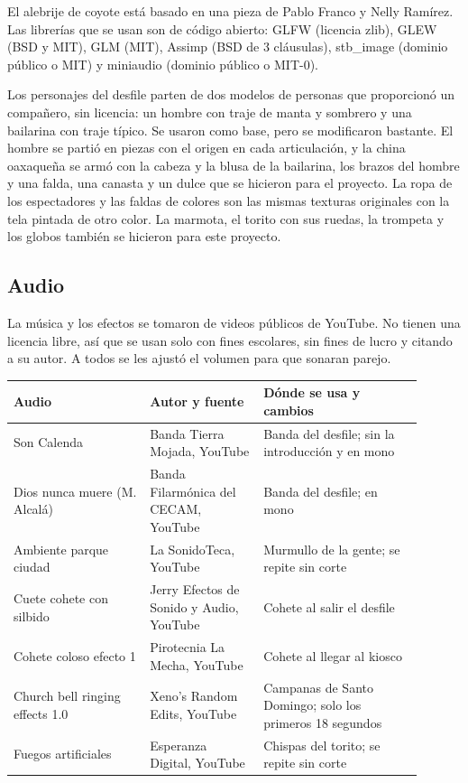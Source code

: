 \documentclass[11pt,a4paper]{article}
\begin{document}
El alebrije de coyote está basado en una pieza de Pablo Franco y Nelly Ramírez.
Las librerías que se usan son de código abierto: GLFW (licencia zlib), GLEW (BSD y MIT), GLM (MIT), Assimp (BSD de 3 cláusulas), stb\_image (dominio público o MIT) y miniaudio (dominio público o MIT-0).

Los personajes del desfile parten de dos modelos de personas que proporcionó un compañero, sin licencia: un hombre con traje de manta y sombrero y una bailarina con traje típico. Se usaron como base, pero se modificaron bastante. El hombre se partió en piezas con el origen en cada articulación, y la china oaxaqueña se armó con la cabeza y la blusa de la bailarina, los brazos del hombre y una falda, una canasta y un dulce que se hicieron para el proyecto. La ropa de los espectadores y las faldas de colores son las mismas texturas originales con la tela pintada de otro color. La marmota, el torito con sus ruedas, la trompeta y los globos también se hicieron para este proyecto.

\subsection{Audio}

La música y los efectos se tomaron de videos públicos de YouTube. No tienen una licencia libre, así que se usan solo con fines escolares, sin fines de lucro y citando a su autor. A todos se les ajustó el volumen para que sonaran parejo.

\begin{longtable}{|p{0.3\linewidth}|p{0.25\linewidth}|p{0.35\linewidth}|}
  \hline
  \textbf{Audio} & \textbf{Autor y fuente} & \textbf{Dónde se usa y cambios} \\ \hline
  \endhead
  Son Calenda & Banda Tierra Mojada, YouTube & Banda del desfile; sin la introducción y en mono \\ \hline
  Dios nunca muere (M. Alcalá) & Banda Filarmónica del CECAM, YouTube & Banda del desfile; en mono \\ \hline
  Ambiente parque ciudad & La SonidoTeca, YouTube & Murmullo de la gente; se repite sin corte \\ \hline
  Cuete cohete con silbido & Jerry Efectos de Sonido y Audio, YouTube & Cohete al salir el desfile \\ \hline
  Cohete coloso efecto 1 & Pirotecnia La Mecha, YouTube & Cohete al llegar al kiosco \\ \hline
  Church bell ringing effects 1.0 & Xeno's Random Edits, YouTube & Campanas de Santo Domingo; solo los primeros 18 segundos \\ \hline
  Fuegos artificiales & Esperanza Digital, YouTube & Chispas del torito; se repite sin corte \\ \hline
\end{longtable}
\end{document}

